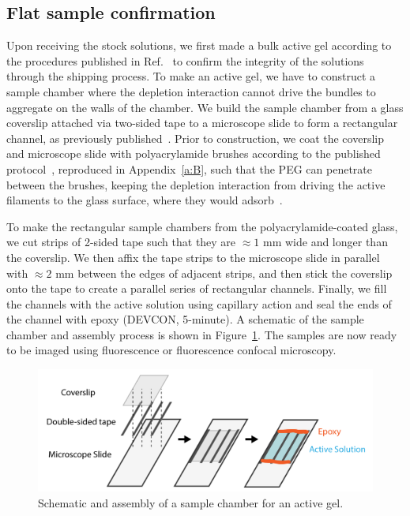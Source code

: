 \subsection{Flat sample confirmation}
Upon receiving the stock solutions, we first made a bulk active gel according to the procedures published in Ref.~\cite{RN3} to confirm the integrity of the solutions through the shipping process.
To make an active gel, we have to construct a sample chamber where the depletion interaction cannot drive the bundles to aggregate on the walls of the chamber.
We build the sample chamber from a glass coverslip attached via two-sided tape to a microscope slide to form a rectangular channel, as previously published~\cite{RN3}.
Prior to construction, we coat the coverslip and microscope slide with polyacrylamide brushes according to the published protocol~\cite{RN3}, reproduced in Appendix~\ref{a:B}, such that the PEG can penetrate between the brushes, keeping the depletion interaction from driving the active filaments to the glass surface, where they would adsorb~\cite{RN3}.

To make the rectangular sample chambers from the polyacrylamide-coated glass, we cut strips of 2-sided tape such that they are $\approx1$ mm wide and longer than the coverslip.
We then affix the tape strips to the microscope slide in parallel with $\approx 2$ mm between the edges of adjacent strips, and then stick the coverslip onto the tape to create a parallel series of rectangular channels.
Finally, we fill the channels with the active solution using capillary action and seal the ends of the channel with epoxy (DEVCON, 5-minute).
A schematic of the sample chamber and assembly process is shown in Figure~\ref{f:3-SampleChamber}.
The samples are now ready to be imaged using fluorescence or fluorescence confocal microscopy.
\begin{figure}
  \centering
  \includegraphics{figures/C3/Ch3-Figs_GelSampleChamber.png}
  \caption{Schematic and assembly of a sample chamber for an active gel.}
  \label{f:3-SampleChamber}
\end{figure}

